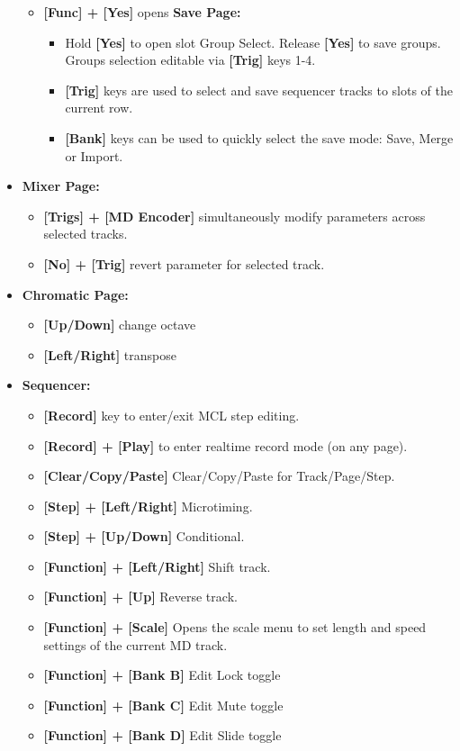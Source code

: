 \begin{itemize}
\begin{itemize}
\item \textbf{[Func] + [Yes]} opens \textbf{Save Page:}
    \begin{itemize}
    \item Hold \textbf{[Yes]} to open slot Group Select. Release \textbf{[Yes]} to save groups.  Groups selection editable via \textbf{[Trig]} keys 1-4.
    \item \textbf{[Trig]} keys are used to select and save sequencer tracks to slots of the current row.
    \item \textbf{[Bank]} keys can be used to quickly select the save mode: Save, Merge or Import.
    \end{itemize}
\end{itemize}

\item \textbf{Mixer Page:}
      \begin{itemize}
       \item \textbf{[Trigs] + [MD Encoder]} simultaneously modify parameters across selected tracks. 
      \item \textbf{[No] + [Trig]} revert parameter for selected track.
       \end{itemize}
\newpage
\item \textbf{Chromatic Page:}
      \begin{itemize}
      \item \textbf{[Up/Down]} change octave
      \item \textbf{[Left/Right]} transpose
      \end{itemize}

\item \textbf{Sequencer:}
\begin{itemize}
      \item \textbf{[Record]} key to enter/exit MCL step editing.
      \item \textbf{[Record] + [Play]} to enter realtime record mode (on any page).
      \item \textbf{[Clear/Copy/Paste]} Clear/Copy/Paste for Track/Page/Step.
      \item \textbf{[Step] + [Left/Right]} Microtiming.
      \item \textbf{[Step] + [Up/Down]} Conditional.
      \item \textbf{[Function] + [Left/Right]} Shift track.
      \item \textbf{[Function] + [Up]} Reverse track.
      \item \textbf{[Function] + [Scale]} Opens the scale menu to set length and speed settings of the current MD track.
      \item \textbf{[Function] + [Bank B]} Edit Lock toggle
      \item \textbf{[Function] + [Bank C]} Edit Mute toggle
      \item \textbf{[Function] + [Bank D]} Edit Slide toggle
\end{itemize}
\end{itemize}



